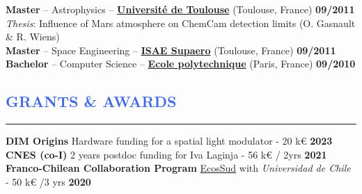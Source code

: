 \documentclass[11pt]{article}
\begin{document}
\textbf{Master} -- Astrophysics --
\href{http://ezomp2.omp.obs-mip.fr/asep/index.php/eng}{\textbf{Université de Toulouse}} (Toulouse, France)
\hfill  { \bf 09/2011} \\
{\small
\null \hspace{0.6cm}
{\it Thesis}: Influence of Mars atmosphere on ChemCam detection limits (O. Gasnault \& R. Wiens)}\\

\textbf{Master} -- Space Engineering -- \href{https://www.isae-supaero.fr/en/}{\textbf{\textbf{ISAE Supaero}}} (Toulouse, France) \hfill  { \bf 09/2011} \\

\textbf{Bachelor} -- Computer Science -- \href{http://www.polytechnique.edu/en/}{\textbf{\textbf{Ecole polytechnique}}} (Paris, France) \hfill    { \bf 09/2010}\\








\vspace{-0.25cm}
\textcolor{RoyalBlue}{\section{\large GRANTS \& AWARDS}
\vspace{-0.35cm}\hrule}

\vspace{0.4cm}
\textbf{DIM Origins} Hardware funding for a spatial light modulator - 20 k€ \hfill \textbf{2023}\\ 

\vspace{-0.2cm}
\textbf{CNES (co-I)} 2 years postdoc funding for Iva Laginja - 56 k€ / 2yrs \hfill \textbf{2021}\\ 

\vspace{-0.2cm}
\textbf{Franco-Chilean Collaboration Program} \href{https://www.univ-paris13.fr/ecos-sud/}{EcosSud} with {\it Universidad de Chile} - 50 k€ /3 yrs \hfill   \textbf{2020}\\ 
\end{document}
